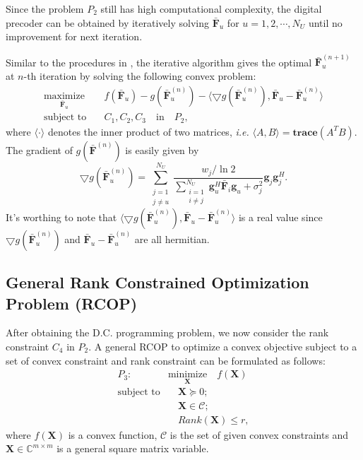 \documentclass[10pt,journal,twocolumn,twoside]{IEEEtran}
\begin{document}
Since the problem $P_2$ still has high computational complexity, the digital precoder can be obtained by iteratively solving $\bar{\bm{F}}_u$ for $u = 1,2,\cdots, N_U$ until no improvement for next iteration.

Similar to the procedures in \cite{kha2012fast}, the iterative algorithm gives the optimal $\bar{\bm{F}}_u^{(n+1)}$ at $n$-th iteration by solving the following convex problem:
\begin{align}\label{DC}
\underset{\bar{\bm{F}}_u}{\text{maximize}}&\quad f(\bar{\bm{F}}_u) - g(\bar{\bm{F}}^{(n)}_u) - \langle \bigtriangledown g(\bar{\bm{F}}^{(n)}_u), \bar{\bm{F}}_u -  \bar{\bm{F}}_u^{(n)} \rangle\\ \nonumber
\text{subject to}& \quad C_1, C_2, C_3\quad \text{in} \quad P_2,
\end{align}
where $\langle \cdot \rangle$ denotes the inner product of two matrices, \textit{i.e.} $\langle A, B \rangle = \textbf{trace}(A^T B)$. The gradient of $g(\bar{\bm{F}}^{(n)})$ is easily given by 
\begin{equation}
	\bigtriangledown g(\bar{\bm{F}}^{(n)}_u) = \sum_{\substack{j=1 \\ j\neq u}}^{N_U}\frac{w_j/\ln 2}{\sum_{\substack{i=1 \\ i\neq j}}^{N_U} \bm{g}_{u}^H \bar{\bm{F}}_i\bm{g}_{u} +\sigma^2_j} \bm{g}_{j} \bm{g}_{j}^H.
\end{equation}
It's worthing to note that $\langle \bigtriangledown g(\bar{\bm{F}}^{(n)}_u), \bar{\bm{F}}_u -  \bar{\bm{F}}_u^{(n)} \rangle$ is a real value since $\bigtriangledown g(\bar{\bm{F}}^{(n)}_u)$ and $\bar{\bm{F}}_u -  \bar{\bm{F}}_u^{(n)}$ are all hermitian.

\subsection{General Rank Constrained Optimization Problem (RCOP)}
After obtaining the D.C. programming problem, we now consider the rank constraint $C_4$ in $P_2$. A general RCOP to optimize a convex objective subject to a set of convex constraint and rank constraint can be formulated as follows:
\begin{align}\label{eq:RCOP}
P_3: \quad& \underset{\bm{X}}{\text{minimize}}   \quad f(\bm{X}) \\
\text{subject to}& \quad \bm{X} \succeq 0;\nonumber\\
& \quad \bm{X} \in \mathcal{C}; \nonumber\\
& \quad Rank(\bm{X})\leq r,
\end{align}
where $f(\bm{X})$ is a convex function, $\mathcal{C}$ is the set of given convex constraints and $\bm{X}\in \mathbb{C}^{m\times m}$ is a general square matrix variable.
\end{document}
